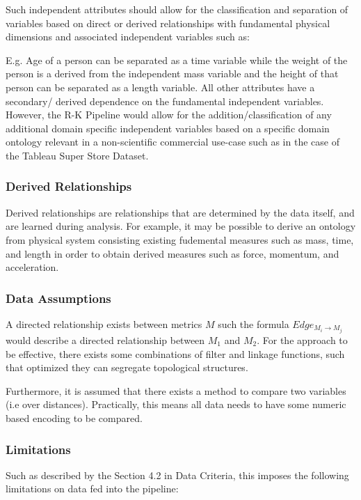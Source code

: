Such independent attributes should allow for the classification and separation of variables based on direct or derived relationships with fundamental physical dimensions and associated independent variables such as:

E.g. Age of a person can be separated as a time variable while the weight of the person is a derived from the independent mass variable and the height of that person can be separated as a length variable. All other attributes have a secondary/ derived dependence on the fundamental independent variables. However, the R-K Pipeline would allow for the addition/classification of any  additional domain specific independent variables based on a specific domain ontology relevant in a non-scientific commercial use-case such as in the case of the Tableau Super Store Dataset.\cite{TableauSuperStore}

\subsubsection{Derived Relationships}
Derived relationships are relationships that are determined by the data itself, and are learned during analysis. For example, it may be possible to derive an ontology from physical system consisting existing fudemental measures such as mass, time, and length in order to obtain derived measures such as force, momentum, and acceleration.

\subsubsection{Data Assumptions}

A directed relationship exists between metrics $M$ such the formula $Edge_{M_{i} \to M_{j}}$ would describe a directed relationship between $M_{1}$ and $M_{2}$. For the approach to be effective, there exists some combinations of filter and linkage functions, such that optimized they can segregate topological structures.

Furthermore, it is assumed that there exists a method to compare two variables (i.e over distances). Practically, this means all data needs to have some numeric based encoding to be compared.

\subsubsection{Limitations}
Such as described by the Section 4.2 in Data Criteria, this imposes the following limitations on data fed into the pipeline:

